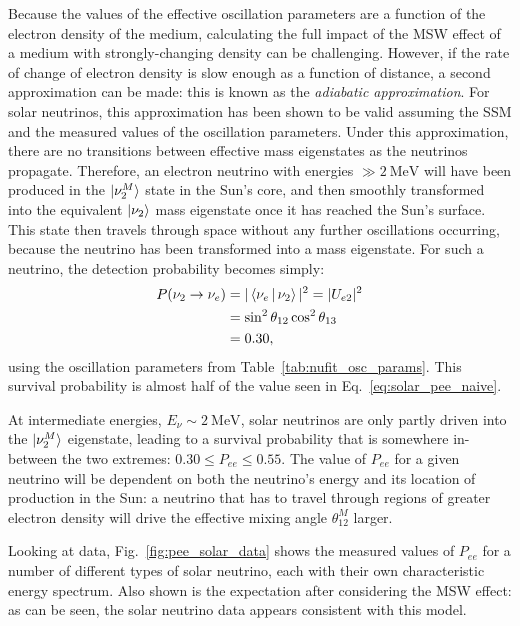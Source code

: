 Because the values of the effective oscillation parameters are a function of the electron density of the medium, calculating the full impact of the MSW effect of a medium with strongly-changing density can be challenging. However, if the rate of change of electron density is slow enough as a function of distance, a second approximation can be made: this is known as the \textit{adiabatic approximation}. For solar neutrinos, this approximation has been shown to be valid assuming the SSM and the measured values of the oscillation parameters. Under this approximation, there are no transitions between effective mass eigenstates as the neutrinos propagate. Therefore, an electron neutrino with energies $\gg\SI{2}{\MeV}$ will have been produced in the $\ket{\nu_{2}^{M}}$ state in the Sun's core, and then smoothly transformed into the equivalent $\ket{\nu_{2}}$ mass eigenstate once it has reached the Sun's surface. This state then travels through space without any further oscillations occurring, because the neutrino has been transformed into a mass eigenstate. For such a neutrino, the detection probability becomes simply:
\begin{align}
    P(\nu_{2}\to\nu_{e}) &= |\Braket{\nu_{e}|\nu_{2}}|^{2} = |U_{e2}|^{2}\\
                         &= \sin^{2}\theta_{12}{}\cos^{2}\theta_{13}\\
                         &= 0.30,
\end{align}
using the oscillation parameters from Table~\ref{tab:nufit_osc_params}. This survival probability is almost half of the value seen in Eq.~\ref{eq:solar_pee_naive}.

At intermediate energies, $E_{\nu}\sim\SI{2}{\MeV}$, solar neutrinos are only partly driven into the $\ket{\nu_{2}^{M}}$ eigenstate, leading to a survival probability that is somewhere in-between the two extremes: $0.30\leq P_{ee} \leq 0.55$. The value of $P_{ee}$ for a given neutrino will be dependent on both the neutrino's energy and its location of production in the Sun: a neutrino that has to travel through regions of greater electron density will drive the effective mixing angle $\theta_{12}^{M}$ larger.

Looking at data, Fig.~\ref{fig:pee_solar_data} shows the measured values of $P_{ee}$ for a number of different types of solar neutrino, each with their own characteristic energy spectrum. Also shown is the expectation after considering the MSW effect: as can be seen, the solar neutrino data appears consistent with this model.

